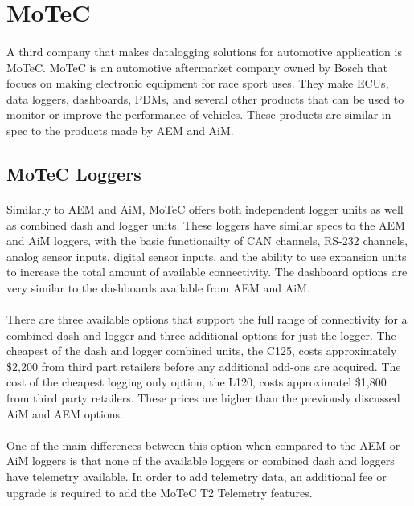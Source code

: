 \section{MoTeC}

\paragraph{}
A third company that makes datalogging solutions for automotive application is MoTeC.
MoTeC is an automotive aftermarket company owned by Bosch that focues on making electronic equipment for race sport uses.
They make ECUs, data loggers, dashboards, PDMs, and several other products that can be used to monitor or improve the performance of vehicles.
These products are similar in spec to the products made by AEM and AiM.

\subsection{MoTeC Loggers}

\paragraph{}
Similarly to AEM and AiM, MoTeC offers both independent logger units as well as combined dash and logger units.
These loggers have similar specs to the AEM and AiM loggers, with the basic functionailty of CAN channels, RS-232 channels, analog sensor inputs, digital sensor inputs, and the ability to use expansion units to increase the total amount of available connectivity.
The dashboard options are very similar to the dashboards available from AEM and AiM.

\paragraph{}
There are three available options that support the full range of connectivity for a combined dash and logger and three additional options for just the logger.
The cheapest of the dash and logger combined units, the C125, costs approximately \$2,200 from third part retailers before any additional add-ons are acquired.
The cost of the cheapest logging only option, the L120, costs approximatel \$1,800 from third party retailers.
These prices are higher than the previously discussed AiM and AEM options.

\paragraph{}
One of the main differences between this option when compared to the AEM or AiM loggers is that none of the available loggers or combined dash and loggers have telemetry available.
In order to add telemetry data, an additional fee or upgrade is required to add the MoTeC T2 Telemetry features.

